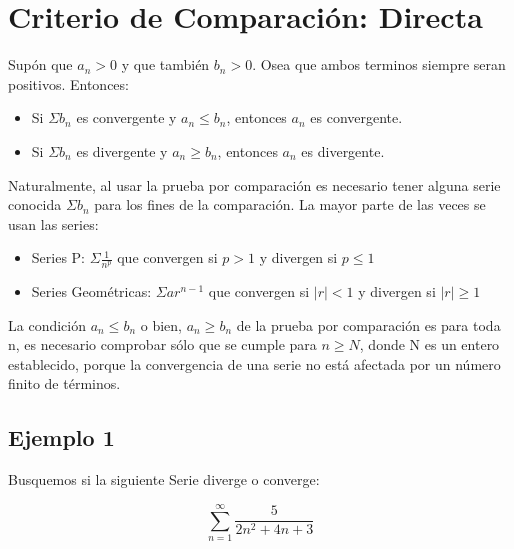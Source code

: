 \documentclass[12pt]{report}							    %
\begin{document}
    \clearpage
    \section{Criterio de Comparación: Directa}

        Supón que $a _n > 0$ y que también $b_n > 0$. Osea que ambos terminos siempre seran positivos.
        Entonces:

        \begin{itemize}
            \item Si $\Sigma b_n$ es convergente y $a_n \leq b_n$, entonces $a_n$ es convergente. 
            \item Si $\Sigma b_n$ es divergente y $a_n \geq b_n$, entonces $a_n$ es divergente. 
        \end{itemize}

        Naturalmente, al usar la prueba por comparación es necesario tener alguna serie conocida $\Sigma b_n$
        para los fines de la comparación. La mayor parte de las veces se usan las series:

        \begin{itemize}
            \item Series P: $\Sigma \frac{1}{n^p}$ que convergen si $p>1$ y divergen si $p\leq 1$
            \item Series Geométricas: $\Sigma ar^{n-1}$ que convergen si $|r|<1$ y divergen si $|r|\geq 1$
        \end{itemize}

        La condición $a_n \leq b_n$ o bien, $a_n \geq b_n$ de la prueba por comparación es para toda n, es
        necesario comprobar sólo que se cumple para $n \geq N$, donde N es un entero establecido, porque
        la convergencia de una serie no está afectada por un número finito de términos.

        \subsection{Ejemplo 1}
        Busquemos si la siguiente Serie diverge o converge:

        \begin{equation*}
            \sum_{n=1}^{\infty} \frac{5}{2n^2 +4n +3}
        \end{equation*}
\end{document}
